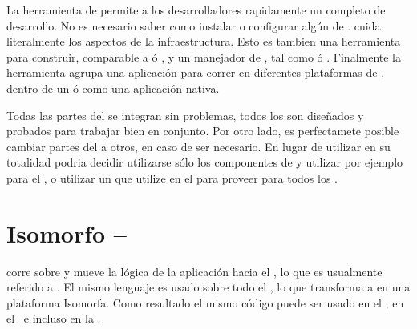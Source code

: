 La herramienta \clitool de \meteor permite a los desarrolladores rapidamente \setup un \environment completo de desarrollo. No es necesario saber como instalar o configurar algún \software de \server. \meteor cuida literalmente los aspectos de la infraestructura. Esto es tambien una herramienta para construir, comparable a \maketool ó \grunttool, y un manejador de \package, tal como \apttool ó \npm. Finalmente la herramienta \clitool agrupa una aplicación para correr en diferentes plataformas de \clients, dentro de un \browser \web ó como una aplicación \mobile nativa.

Todas las partes del \stack se integran sin problemas, todos los \packages \core son diseñados y probados para trabajar bien en conjunto. Por otro lado, es perfectamete posible cambiar partes del \stack a otros, en caso de ser necesario. En lugar de utilizar \meteor en su totalidad podria decidir utilizarse sólo los componentes de \server y utilizar por ejemplo \angularjs para el \clientside, o utilizar un \javabackend que utilize \meteor en el \frontend para proveer \updates \realtime para todos los \clients.

\section{\framework Isomorfo – \fullstack \javascript}

\meteor corre sobre \nodejs y mueve la lógica de la aplicación hacia el \browser, lo que es usualmente referido a \singlepageapp. El mismo lenguaje es usado sobre todo el \stack, lo que transforma a \meteor en una plataforma Isomorfa. Como resultado el mismo código \javascript puede ser usado en el \server, en el \client\, e incluso en la \database.

